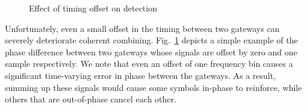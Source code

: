 

\begin{figure}[!htb]
\centering
\compactimg
{}
\hfill
{}
\vspace{-10pt}
\caption{Effect of timing offset on detection}
\label{fig:toffset}
\vspace{-10pt}
\end{figure}

Unfortunately, even a small offset in the timing between two gateways can
severely deteriorate coherent combining. Fig.~\ref{fig:toffset} depicts a
simple example of the phase difference between two gateways whose signals are
offset by zero and one sample respectively. We note that even an offset of one
frequency bin causes a significant time-varying error in phase between the
gateways. As a result, summing up these signals would cause some symbols
in-phase to reinforce, while others that are out-of-phase cancel each other.
\vspace*{0.1in}

